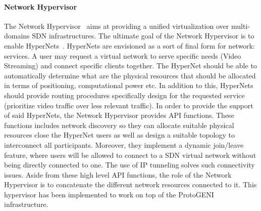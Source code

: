 \paragraph{Network Hypervisor}
The Network Hypervisor~\cite{NetworkHypervisor-Huang2013} aims at providing a unified virtualization over multi-domains SDN infrastructures. 
The ultimate goal of the Network Hypervisor is to enable HyperNets~\cite{HyperNet-Huang2013a}. HyperNets are envisioned as a sort of final form for network: services. A user may request a virtual network to serve specific needs (\eg Video Streaming) and connect specific clients together.
The HyperNet should be able to automatically determine what are the physical resources that should be allocated in terms of positioning, computational power etc. In addition to this, HyperNets should provide routing procedures specifically design for the requested service (\ie prioritize video traffic over less relevant traffic).
In order to provide the support of said HyperNets, the Network Hypervisor provides API functions. These functions includes network discovery so they can allocate suitable physical resources close the HyperNet users as well as design a suitable topology to interconnect all participants.
Moreover, they implement a dynamic join/leave feature, where users will be allowed to connect to a SDN virtual network without being directly connected to one. The use of IP tunneling solves such connectivity issues.
Aside from these high level API functions, the role of the Network Hypervisor is to concatenate the different network resources connected to it.
This hypervisor has been implemented to work on top of the ProtoGENI~\cite{protoGENI} infrastructure.

